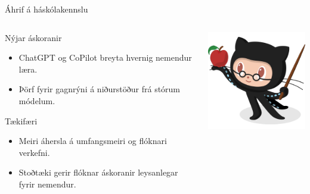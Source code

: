 \documentclass[
    NAME={Dr. Helga Ingimundardóttir},
    EMAIL={helgaingim@hi.is},
    FACULTY={Iðnaðarverkfræðideild},
    TITLE={Spáum fyrir um framtíð gervigreindar},
    SUBTITLE={út frá akademísku sjónarmiði},
    SEMINAR={Stjórnvísi},
    DATE={22. febrúar 2025},
    WIDE=true,
    ICELANDIC=true
]{HI-LaTeX/hi-beamer}
\begin{document}

\begin{frame}{Áhrif á háskólakennslu}
\begin{columns}
    \begin{column}{0.7\linewidth}
    \begin{block}{Nýjar áskoranir}
        \begin{itemize}
            \item ChatGPT og CoPilot breyta hvernig nemendur læra.
            \item Þörf fyrir gagnrýni á niðurstöður frá stórum módelum.
        \end{itemize}
    \end{block}
    \begin{block}{Tækifæri}
        \begin{itemize}
            \item Meiri áhersla á umfangsmeiri og flóknari verkefni.
            \item Stoðtæki gerir flóknar áskoranir leysanlegar fyrir nemendur.
        \end{itemize}
    \end{block}
    \end{column}
    \begin{column}{.2\linewidth}
        \centering
        \includegraphics[width=\linewidth]{myndir/github-education.png}
    \end{column}
\end{columns}
\end{frame}
\end{document}
